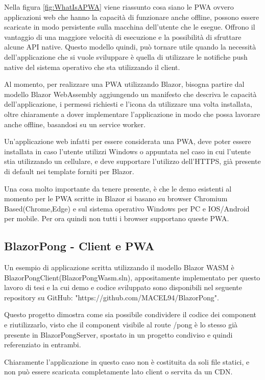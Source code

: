 Nella figura \ref{fig:WhatIsAPWA} viene riassunto cosa siano le PWA ovvero applicazioni web che hanno la capacit\`a di funzionare anche offline, possono essere scaricate in modo persistente sulla macchina dell'utente che le esegue.
Offrono il vantaggio di una maggiore velocit\`a di esecuzione e la possibilit\`a di sfruttare alcune API native.
Questo modello quindi, pu\`o tornare utile quando la necessit\`a dell'applicazione che si vuole sviluppare \`e quella di utilizzare le notifiche push native del sistema operativo che sta utilizzando il client.

Al momento, per realizzare una PWA utilizzando Blazor, bisogna partire dal modello Blazor WebAssembly aggiungendo un manifesto che descriva le capacit\`a dell'applicazione, i permessi richiesti e l'icona da utilizzare una volta installata, oltre chiaramente a dover implementare l'applicazione in modo che possa lavorare anche offline, basandosi su un service worker\cite{blazorPWA}.

Un'applicazione web infatti per essere considerata una PWA, deve poter essere installata in caso l'utente utilizzi Windows o appuntata nel caso in cui l'utente stia utilizzando un cellulare, e deve supportare l'utilizzo dell'HTTPS, già presente di default nei template forniti per Blazor.

Una cosa molto importante da tenere presente, \`e che le demo esistenti al momento per le PWA scritte in Blazor si basano su browser Chromium Based(Chrome,Edge) e sul sistema operativo Windows per PC e IOS/Android per mobile.
Per ora quindi non tutti i browser supportano queste PWA.

\subsection{BlazorPong - Client e PWA}\label{sez:bpongclient}
Un esempio di applicazione scritta utilizzando il modello Blazor WASM \`e BlazorPongClient(BlazorPongWasm.sln), appositamente implementato per questo lavoro di tesi e la cui demo e codice sviluppato sono disponibili nel seguente repository su GitHub: "https://github.com/MACEL94/BlazorPong".

Questo progetto dimostra come sia possibile condividere il codice dei component e riutilizzarlo, visto che il component visibile al route /pong \`e lo stesso gi\`a presente in BlazorPongServer, spostato in un progetto condiviso e quindi referenziato in entrambi.

Chiaramente l'applicazione in questo caso non \`e costituita da soli file statici, e non pu\`o essere scaricata completamente lato client o servita da un CDN.

